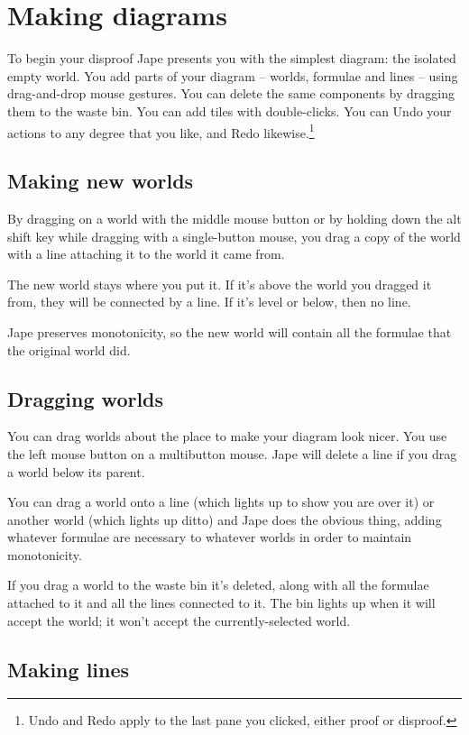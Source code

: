 \documentclass[11pt]{article}
\begin{document}
\section{Making diagrams}

To begin your disproof Jape presents you with the simplest diagram: the isolated empty world. You add parts of your diagram -- worlds, formulae and lines -- using drag-and-drop mouse gestures. You can delete the same components by dragging them to the waste bin. You can add tiles with double-clicks. You can Undo your actions to any degree that you like, and Redo likewise.\footnote{Undo and Redo apply to the last pane you clicked, either proof or disproof.} 

\subsection{Making new worlds}

By dragging on a world with the middle mouse button or by holding down the alt shift key while dragging with a single-button mouse, you drag a copy of the world with a line attaching it to the world it came from.

The new world stays where you put it. If it's above the world you dragged it from, they will be connected by a line. If it's level or below, then no line.

Jape preserves monotonicity, so the new world will contain all the formulae that the original world did.

\subsection{Dragging worlds}

You can drag worlds about the place to make your diagram look nicer. You use the left mouse button on a multibutton mouse. Jape will delete a line if you drag a world below its parent.

You can drag a world onto a line (which lights up to show you are over it) or another world (which lights up ditto) and Jape does the obvious thing, adding whatever formulae are necessary to whatever worlds in order to maintain monotonicity.

If you drag a world to the waste bin it's deleted, along with all the formulae attached to it and all the lines connected to it. The bin lights up when it will accept the world; it won't accept the currently-selected world.

\subsection{Making lines}
\end{document}
